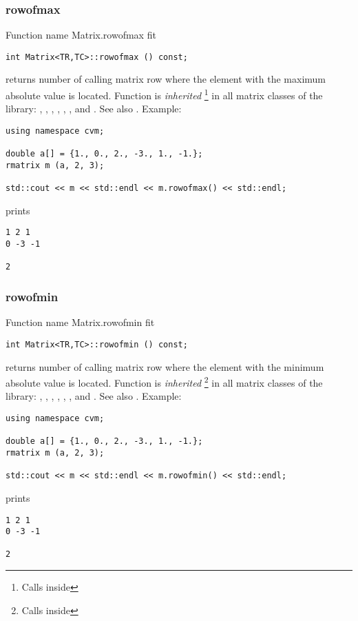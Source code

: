 \subsubsection{rowofmax}
Function%
\pdfdest name {Matrix.rowofmax} fit
\begin{verbatim}
int Matrix<TR,TC>::rowofmax () const;
\end{verbatim}
returns  \Based number of calling matrix row
where the element with the maximum absolute value is located.
Function is \emph{inherited}%
\footnote{Calls  inside}
in all matrix classes
of the library:
,   ,
, ,
, ,
 and .
See also .
Example:
\begin{Verbatim}
using namespace cvm;

double a[] = {1., 0., 2., -3., 1., -1.};
rmatrix m (a, 2, 3);

std::cout << m << std::endl << m.rowofmax() << std::endl;
\end{Verbatim}
prints
\begin{Verbatim}
1 2 1
0 -3 -1

2
\end{Verbatim}
\newpage




\subsubsection{rowofmin}
Function%
\pdfdest name {Matrix.rowofmin} fit
\begin{verbatim}
int Matrix<TR,TC>::rowofmin () const;
\end{verbatim}
returns  \Based number of calling matrix row
where the element with the minimum absolute value is located.
Function is \emph{inherited}%
\footnote{Calls  inside}
in all matrix classes
of the library:
,   ,
, ,
, ,
 and .
See also .
Example:
\begin{Verbatim}
using namespace cvm;

double a[] = {1., 0., 2., -3., 1., -1.};
rmatrix m (a, 2, 3);

std::cout << m << std::endl << m.rowofmin() << std::endl;
\end{Verbatim}
prints
\begin{Verbatim}
1 2 1
0 -3 -1

2
\end{Verbatim}
\newpage




